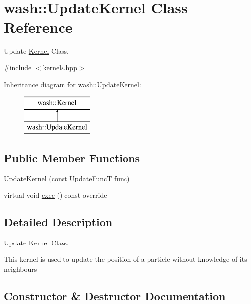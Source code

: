 \hypertarget{classwash_1_1UpdateKernel}{}\section{wash\+:\+:Update\+Kernel Class Reference}
\label{classwash_1_1UpdateKernel}


Update \mbox{\hyperlink{classwash_1_1Kernel}{Kernel}} Class.  




{\ttfamily \#include $<$kernels.\+hpp$>$}

Inheritance diagram for wash\+:\+:Update\+Kernel\+:\begin{figure}[H]
\begin{center}
\leavevmode
\includegraphics[height=2.000000cm]{classwash_1_1UpdateKernel}
\end{center}
\end{figure}
\subsection*{Public Member Functions}
\begin{DoxyCompactItemize}
\item 
\mbox{\hyperlink{classwash_1_1UpdateKernel_a2cd95c4f9bcbceff9df7d094f7d7011f}{Update\+Kernel}} (const \mbox{\hyperlink{namespacewash_aaae2f0d4980b7c550d6de709b35f0b8e}{Update\+FuncT}} func)
\item 
virtual void \mbox{\hyperlink{classwash_1_1UpdateKernel_a72ec6b0ea453d97708f3fcfd98970366}{exec}} () const override
\end{DoxyCompactItemize}


\subsection{Detailed Description}
Update \mbox{\hyperlink{classwash_1_1Kernel}{Kernel}} Class. 

This kernel is used to update the position of a particle without knowledge of its neighbours 

\subsection{Constructor \& Destructor Documentation}
\mbox{\label{classwash_1_1UpdateKernel_a2cd95c4f9bcbceff9df7d094f7d7011f}} 
